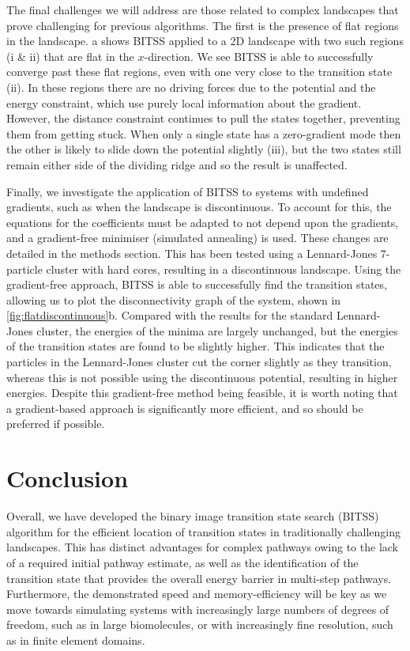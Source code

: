 \documentclass[twocolumn,10pt]{revtex4}
\begin{document}
The final challenges we will address are those related to complex landscapes that prove challenging for previous algorithms.
The first is the presence of flat regions in the landscape.
a shows BITSS applied to a 2D landscape with two such regions (i \& ii) that are flat in the $x$-direction.
We see BITSS is able to successfully converge past these flat regions, even with one very close to the transition state (ii).
In these regions there are no driving forces due to the potential and the energy constraint, which use purely local information about the gradient.
However, the distance constraint continues to pull the states together, preventing them from getting stuck.
When only a single state has a zero-gradient mode then the other is likely to slide down the potential slightly (iii), but the two states still remain either side of the dividing ridge and so the result is unaffected.


Finally, we investigate the application of BITSS to systems with undefined gradients, such as when the landscape is discontinuous.
To account for this, the equations for the coefficients must be adapted to not depend upon the gradients, and a gradient-free minimiser (simulated annealing) is used.
These changes are detailed in the methods section.
This has been tested using a Lennard-Jones 7-particle cluster with hard cores, resulting in a discontinuous landscape.
Using the gradient-free approach, BITSS is able to successfully find the transition states, allowing us to plot the disconnectivity graph of the system, shown in \cref{fig:flatdiscontinuous}b.
Compared with the results for the standard Lennard-Jones cluster, the energies of the minima are largely unchanged, but the energies of the transition states are found to be slightly higher.
This indicates that the particles in the Lennard-Jones cluster cut the corner slightly as they transition, whereas this is not possible using the discontinuous potential, resulting in higher energies.
Despite this gradient-free method being feasible, it is worth noting that a gradient-based approach is significantly more efficient, and so should be preferred if possible.


\section{Conclusion}
Overall, we have developed the binary image transition state search (BITSS) algorithm for the efficient location of transition states in traditionally challenging landscapes.
This has distinct advantages for complex pathways owing to the lack of a required initial pathway estimate, as well as the identification of the transition state that provides the overall energy barrier in multi-step pathways.
Furthermore, the demonstrated speed and memory-efficiency will be key as we move towards simulating systems with increasingly large numbers of degrees of freedom, such as in large biomolecules, or with increasingly fine resolution, such as in finite element domains.
\end{document}
